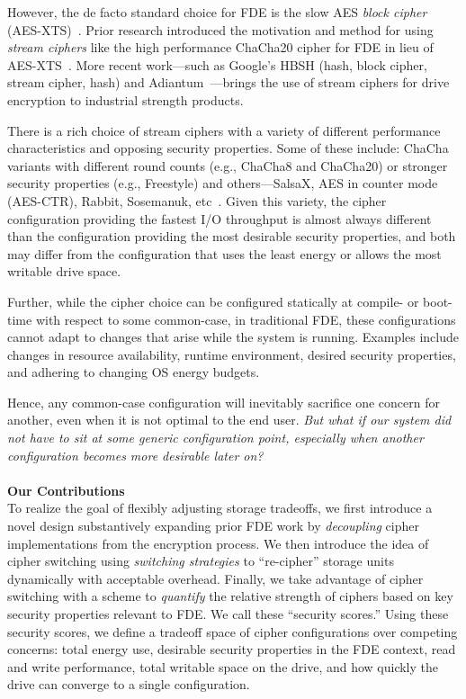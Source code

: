 However, the de facto standard choice for FDE is the slow AES \emph{block
cipher} (AES-XTS)~\cite{AES, AES-XTS}. Prior research introduced the motivation
and method for using \emph{stream ciphers} like the high performance ChaCha20
cipher for FDE in lieu of AES-XTS~\cite{StrongBox, ChaCha20}. More recent
work---such as Google's HBSH (hash, block cipher, stream cipher, hash) and
Adiantum~\cite{HBSH, Adiantum}---brings the use of stream ciphers for drive
encryption to industrial strength products.

There is a rich choice of stream ciphers with a variety of different performance
characteristics and opposing security properties. Some of these include: ChaCha
variants with different round counts (e.g., ChaCha8 and ChaCha20) or stronger
security properties (e.g., Freestyle) and others---SalsaX, AES in counter mode
(AES-CTR), Rabbit, Sosemanuk, etc~\cite{Freestyle, SalsaX, Rabbit, Sosemanuk,
ChaCha20, AES-CTR}. Given this variety, the cipher configuration providing the
fastest I/O throughput is almost always different than the configuration
providing the most desirable security properties, and both may differ from the
configuration that uses the least energy or allows the most writable
drive space.

Further, while the cipher choice can be configured statically at compile- or
boot-time with respect to some common-case, in traditional FDE, these
configurations cannot adapt to changes that arise while the system is
running. Examples include changes in resource availability, runtime environment,
desired security properties, and adhering to changing OS energy budgets.

Hence, any common-case configuration will inevitably sacrifice one concern for
another, even when it is not optimal to the end user. \emph{But what if our
system did not have to sit at some generic configuration point, especially when
another configuration becomes more desirable later on?}\\
\\
\textbf{Our Contributions}\\
To realize the goal of flexibly adjusting storage tradeoffs, we first introduce
a novel design substantively expanding prior FDE work by \emph{decoupling}
cipher implementations from the encryption process. We then introduce the idea
of cipher switching using \emph{switching strategies} to ``re-cipher'' storage
units dynamically with acceptable overhead. Finally, we take advantage of cipher
switching with a scheme to \emph{quantify} the relative strength of ciphers
based on key security properties relevant to FDE. We call these ``security
scores.'' Using these security scores, we define a tradeoff space of cipher
configurations over competing concerns: total energy use, desirable security
properties in the FDE context, read and write performance, total writable space
on the drive, and how quickly the drive can converge to a single configuration.

